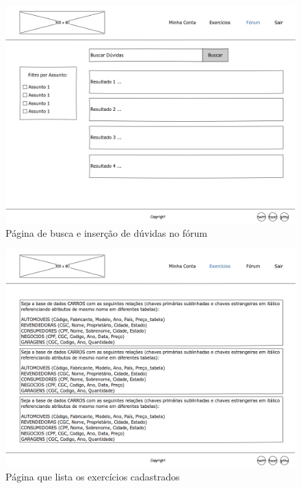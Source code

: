\documentclass[graduacao,brazil]{ThesisPUC}
\begin{document}
\begin{figure}[H]
    \centering
    \includegraphics[width=\linewidth]{Imagens/ForumPage.png}
    \caption{P\'{a}gina de busca e inser\c{c}\~{a}o de d\'{u}vidas no f\'{o}rum}
\end{figure}

\begin{figure}[H]
    \centering
    \includegraphics[width=\linewidth]{Imagens/ExercisePage.png}
    \caption{P\'{a}gina que lista os exerc\'{i}cios cadastrados}
\end{figure}
\end{document}
